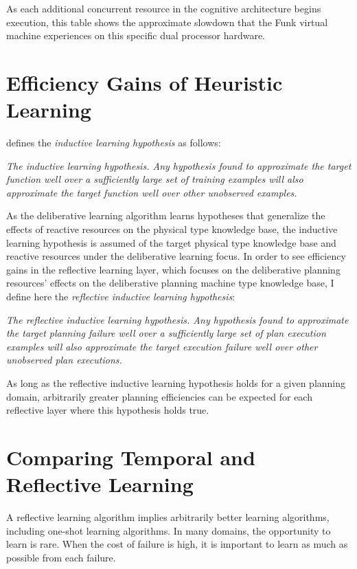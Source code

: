 As each additional concurrent resource in the cognitive architecture
begins execution, this table shows the approximate slowdown that the
Funk virtual machine experiences on this specific dual processor
hardware.

\section{Efficiency Gains of Heuristic Learning}

\cite{mitchell:1997} defines the \emph{inductive learning hypothesis}
as follows:
\begin{definition}\emph{
\emph{The inductive learning hypothesis.} Any hypothesis found to
approximate the target function well over a sufficiently large set of
training examples will also approximate the target function well over
other unobserved examples.  }\end{definition} \noindent As the
deliberative learning algorithm learns hypotheses that generalize the
effects of reactive resources on the physical type knowledge base, the
inductive learning hypothesis is assumed of the target physical type
knowledge base and reactive resources under the deliberative learning
focus.  In order to see efficiency gains in the reflective learning
layer, which focuses on the deliberative planning resources' effects
on the deliberative planning machine type knowledge base, I define
here the \emph{reflective inductive learning hypothesis}:
\begin{definition}\emph{
\emph{The reflective inductive learning hypothesis.} Any hypothesis
found to approximate the target planning failure well over a
sufficiently large set of plan execution examples will also
approximate the target execution failure well over other unobserved
plan executions.}\end{definition} As long as the reflective inductive
learning hypothesis holds for a given planning domain, arbitrarily
greater planning efficiencies can be expected for each reflective
layer where this hypothesis holds true.

\section{Comparing Temporal and Reflective Learning}

A reflective learning algorithm implies arbitrarily better learning
algorithms, including one-shot learning algorithms.  In many domains,
the opportunity to learn is rare.  When the cost of failure is high,
it is important to learn as much as possible from each failure.

